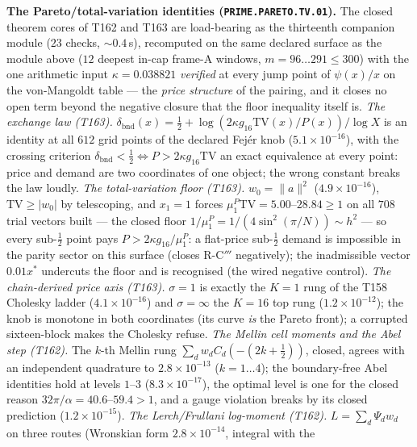 \par\smallskip\noindent\textbf{The Pareto/total-variation identities
(\texttt{PRIME.PARETO.TV.01}).}
The closed theorem cores of T162 and T163 are load-bearing as the
thirteenth companion module ($23$ checks, ${\sim}0.4$\,s), recomputed on
the same declared surface as the module above ($12$ deepest in-cap
frame-A windows, $m=96\ldots291\le300$) with the one arithmetic input
$\kappa=0.038821$ \emph{verified} at every jump point of $\psi(x)/x$ on
the von-Mangoldt table --- the \emph{price structure} of the pairing,
and it closes no open term beyond the negative closure that the floor
inequality itself is.
\emph{The exchange law (T163).}
$\delta_{\mathrm{bnd}}(x)=\tfrac12+\log(2\kappa g_{16}\mathrm{TV}(x)/P(x))/\log X$
is an identity at all $612$ grid points of the declared Fej\'er knob
($5.1\times10^{-16}$), with the crossing criterion
$\delta_{\mathrm{bnd}}<\tfrac12\iff P>2\kappa g_{16}\mathrm{TV}$ an exact
equivalence at every point: price and demand are two coordinates of one
object; the wrong constant breaks the law loudly.
\emph{The total-variation floor (T163).} $w_0=\|a\|^2$
($4.9\times10^{-16}$), $\mathrm{TV}\ge|w_0|$ by telescoping, and
$x_1=1$ forces $\mu^P_1\mathrm{TV}=5.00$--$28.84\ge1$ on all $708$ trial
vectors built --- the closed floor
$1/\mu^P_1=1/(4\sin^2(\pi/N))\sim h^2$ --- so every sub-$\tfrac12$ point
pays $P>2\kappa g_{16}/\mu^P_1$: a flat-price sub-$\tfrac12$ demand is
impossible in the parity sector on this surface (closes R-C$'''$
negatively); the inadmissible vector $0.01x^*$ undercuts the floor and
is recognised (the wired negative control).
\emph{The chain-derived price axis (T163).} $\sigma=1$ is exactly the
$K=1$ rung of the T158 Cholesky ladder ($4.1\times10^{-16}$) and
$\sigma=\infty$ the $K=16$ top rung ($1.2\times10^{-12}$); the knob is
monotone in both coordinates (its curve \emph{is} the Pareto front); a
corrupted sixteen-block makes the Cholesky refuse.
\emph{The Mellin cell moments and the Abel step (T162).} The $k$-th
Mellin rung $\sum_dw_dC_d(-(2k+\tfrac12))$, closed, agrees with an
independent quadrature to $2.8\times10^{-13}$ ($k=1\ldots4$); the
boundary-free Abel identities hold at levels $1$--$3$
($8.3\times10^{-17}$), the optimal level is one for the closed reason
$32\pi/\alpha=40.6$--$59.4>1$, and a gauge violation breaks by its
closed prediction ($1.2\times10^{-15}$).
\emph{The Lerch/Frullani log-moment (T162).} $L=\sum_d\Psi_dw_d$ on
three routes (Wronskian form $2.8\times10^{-14}$, integral with the
